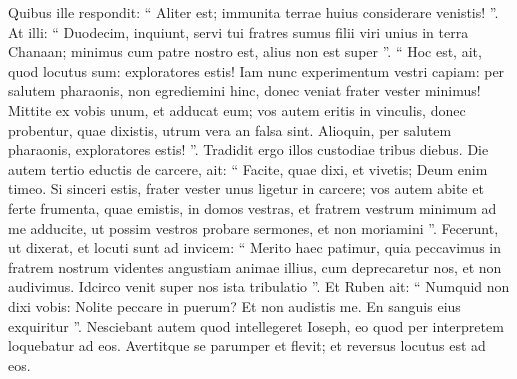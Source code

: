 \begin{biblechapter}
\begin{biblechapter}
\begin{biblechapter}
\begin{biblechapter}
\begin{biblechapter}
\begin{biblechapter}
\begin{biblechapter}
\begin{biblechapter}
\begin{biblechapter}
\begin{biblechapter}
\begin{biblechapter}
\begin{biblechapter}
\begin{biblechapter}
\begin{biblechapter}
\begin{biblechapter}
\begin{biblechapter}
\begin{biblechapter}
\begin{biblechapter}
\begin{biblechapter}
\begin{biblechapter}
\begin{biblechapter}
\begin{biblechapter}
\begin{biblechapter}
\begin{biblechapter}
\begin{biblechapter}
\begin{biblechapter}
\begin{biblechapter}
\begin{biblechapter}
\begin{biblechapter}
\begin{biblechapter}
\begin{biblechapter}
\begin{biblechapter}
\begin{biblechapter}
\begin{biblechapter}
\begin{biblechapter}
\begin{biblechapter}
\begin{biblechapter}
\begin{biblechapter}
\begin{biblechapter}
\begin{biblechapter}
\begin{biblechapter}
\begin{biblechapter}
\verse Quibus ille respondit: “ Aliter est; immunita terrae huius considerare venistis! ”. 
\verse At illi: “ Duodecim, inquiunt, servi tui fratres sumus filii viri unius in terra Chanaan; minimus cum patre nostro est, alius non est super ”.
 \verse “ Hoc est, ait, quod locutus sum: exploratores estis! 
\verse Iam nunc experimentum vestri capiam: per salutem pharaonis, non egrediemini hinc, donec veniat frater vester minimus! 
\verse Mittite ex vobis unum, et adducat eum; vos autem eritis in vinculis, donec probentur, quae dixistis, utrum vera an falsa sint. Alioquin, per salutem pharaonis, exploratores estis! ”. 
\verse Tradidit ergo illos custodiae tribus diebus.
 \verse Die autem tertio eductis de carcere, ait: “ Facite, quae dixi, et vivetis; Deum enim timeo. 
\verse Si sinceri estis, frater vester unus ligetur in carcere; vos autem abite et ferte frumenta, quae emistis, in domos vestras, 
\verse et fratrem vestrum minimum ad me adducite, ut possim vestros probare sermones, et non moriamini ”.
 Fecerunt, ut dixerat, 
\verse et locuti sunt ad invicem: “ Merito haec patimur, quia peccavimus in fratrem nostrum videntes angustiam animae illius, cum deprecaretur nos, et non audivimus. Idcirco venit super nos ista tribulatio ”. 
\verse Et Ruben ait: “ Numquid non dixi vobis: Nolite peccare in puerum? Et non audistis me. En sanguis eius exquiritur ”.
 \verse Nesciebant autem quod intellegeret Ioseph, eo quod per interpretem loquebatur ad eos. 
\verse Avertitque se parumper et flevit; et reversus locutus est ad eos. 

\end{biblechapter}
\end{biblechapter}
\end{biblechapter}
\end{biblechapter}
\end{biblechapter}
\end{biblechapter}
\end{biblechapter}
\end{biblechapter}
\end{biblechapter}
\end{biblechapter}
\end{biblechapter}
\end{biblechapter}
\end{biblechapter}
\end{biblechapter}
\end{biblechapter}
\end{biblechapter}
\end{biblechapter}
\end{biblechapter}
\end{biblechapter}
\end{biblechapter}
\end{biblechapter}
\end{biblechapter}
\end{biblechapter}
\end{biblechapter}
\end{biblechapter}
\end{biblechapter}
\end{biblechapter}
\end{biblechapter}
\end{biblechapter}
\end{biblechapter}
\end{biblechapter}
\end{biblechapter}
\end{biblechapter}
\end{biblechapter}
\end{biblechapter}
\end{biblechapter}
\end{biblechapter}
\end{biblechapter}
\end{biblechapter}
\end{biblechapter}
\end{biblechapter}
\end{biblechapter}
